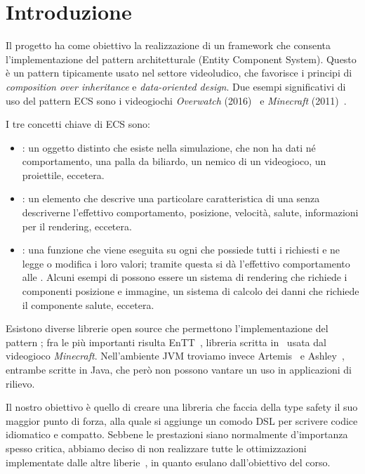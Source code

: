 \chapter*{Introduzione}
Il progetto ha come obiettivo la realizzazione di un framework che consenta l'implementazione del pattern
architetturale \ECS (Entity Component System).
Questo è un pattern tipicamente usato nel settore videoludico, che favorisce i principi di
\textit{composition over inheritance} e \textit{data-oriented design}.
Due esempi significativi di uso del pattern ECS sono i videogiochi \textit{Overwatch} (2016)~\cite{gdc:overwatch}
e \textit{Minecraft} (2011)~\cite{minecraft}.

I tre concetti chiave di ECS sono:
\begin{itemize}
    \item \Entity: un oggetto distinto che esiste nella simulazione, che non ha dati né comportamento,
    \eg una palla da biliardo, un nemico di un videogioco, un proiettile, eccetera.
    \item \Component: un elemento che descrive una particolare caratteristica di una \Entity senza descriverne
    l'effettivo comportamento, \eg posizione, velocità, salute, informazioni per il rendering, eccetera.
    \item \System: una funzione che viene eseguita su ogni \Entity che possiede tutti i \Component richiesti e ne
    legge o modifica i loro valori;
    tramite questa si dà l'effettivo comportamento alle \Entity.
    Alcuni esempi di \System possono essere un sistema di rendering che richiede i componenti posizione e immagine,
    un sistema di calcolo dei danni che richiede il componente salute, eccetera.
\end{itemize}

Esistono diverse librerie open source che permettono l'implementazione del pattern \ECS; fra le più importanti risulta
EnTT~\cite{entt}, libreria scritta in \CC\ usata dal videogioco \textit{Minecraft}.
Nell'ambiente JVM troviamo invece Artemis~\cite{artemis} e Ashley~\cite{ashley}, entrambe scritte in
Java, che però non possono vantare un uso in applicazioni di rilievo.

Il nostro obiettivo è quello di creare una libreria che faccia della type safety il suo maggior punto di forza,
alla quale si aggiunge un comodo DSL per scrivere codice idiomatico e compatto.
Sebbene le prestazioni siano normalmente d'importanza spesso critica, abbiamo deciso di non realizzare tutte le
ottimizzazioni implementate dalle altre liberie~\cite{entt:optimizations}, in quanto esulano dall'obiettivo del corso.
